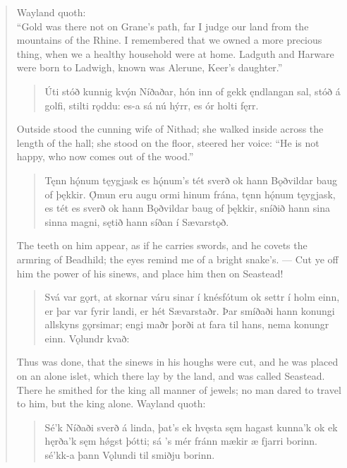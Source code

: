 \begin{verse}
\bvb Wayland quoth: \\
\bvb “Gold was there not on Grane’s path, far I judge our land from the mountains of the Rhine. I remembered that we owned a more precious thing, when we a healthy household were at home. Ladguth and Harware were born to Ladwigh, known was Alerune, Keer’s daughter.”

\begin{verse}
\bva Úti stóð kunnig \hld kvǫ́n Níðaðar,
hón inn of gekk \hld ęndlangan sal,
stóð á golfi, \hld stilti rǫddu:
es-a sá nú hýrr, \hld es ór holti fęrr. \\%
\end{verse}

\bvb Outside stood the cunning wife of Nithad; she walked inside across the length of the hall; she stood on the floor, steered her voice: “He is not happy, who now comes out of the wood.\footnotemark[1]”

\begin{verse}
\bva Tęnn hǫ́num tęygjask \hld es hǫ́num’s tét sverð
ok hann Bǫðvildar \hld baug of þękkir.
Ǫ́mun eru augu \hld ormi hinum frána,
tęnn hǫ́num tęygjask, \hld es tét es sverð
ok hann Bǫðvildar \hld baug of þękkir,
sníðið hann sina \hld sinna magni,
sętið hann síðan \hld í Sævarstǫð. \\%
\end{verse}

\bvb The teeth on him appear, as if he carries swords, and he covets the armring of Beadhild; the eyes remind me of a bright snake’s. — Cut ye off him the power of his sinews, and place him then on Seastead!

\begin{verse}
\bva Svá var gǫrt, at skornar váru sinar í knésfótum ok settr í holm einn, er þar var fyrir landi, er hét Sævarstaðr. Þar smíðaði hann konungi allskyns gǫrsimar; engi maðr þorði at fara til hans, nema konungr einn. Vǫlundr kvað: \\%
\end{verse}

\bvb Thus was done, that the sinews in his houghs were cut, and he was placed on an alone islet, which there lay by the land, and was called Seastead. There he smithed for the king all manner of jewels; no man dared to travel to him, but the king alone. Wayland quoth: \\

\begin{verse}
\bva Sé’k Níðaði \hld sverð á linda,
þat’s ek hvęsta \hld sęm hagast kunna’k
ok ek hęrða’k \hld sęm hǿgst þótti;
sá ’s mér fránn mækir \hld æ fjarri borinn.
sé’kk-a þann Vǫlundi \hld til smiðju borinn. \\%
\end{verse}


\end{verse}
